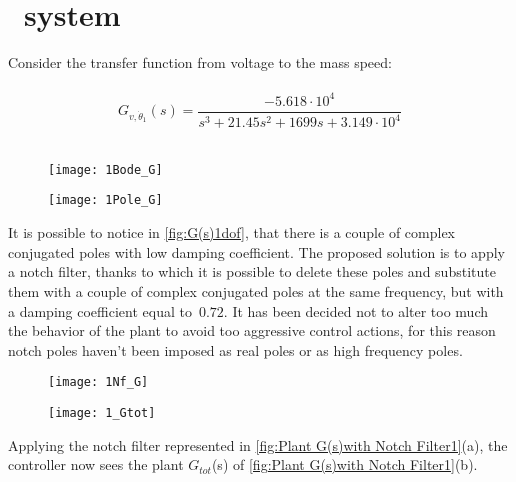 
\section{\onedof\ system}
Consider the transfer function from voltage to the mass speed:\\
\\
\[	
G_{v, \dot \theta_1}(s)=
\frac{-5.618 \cdot 10^{4}}{{s^3 + 21.45 s^{2}}+1699 s+3.149 \cdot 10^{4}}
\]
\\

\begin{figure*}[h]
	\centering
	\begin{subfigure}{0.55\columnwidth}
		\texttt{[image: 1Bode\_G]}
	\end{subfigure}
	\begin{subfigure}{0.4\columnwidth}
		\texttt{[image: 1Pole\_G]}
	\end{subfigure}
	\caption{$G_{v, \dot \theta_1}(s)$}
	\label{fig:G(s)1dof}
\end{figure*}

It is possible to notice in \cref{fig:G(s)1dof}, that there is a couple of complex conjugated poles with low damping coefficient. The proposed solution is to apply a notch filter, thanks to which it is possible to delete these poles and substitute them with a couple of complex conjugated poles at the same frequency, but with a damping coefficient equal to~$0.72$. It has been decided not to alter too much the behavior of the plant to avoid too aggressive control actions, for this reason notch poles haven't been imposed as real poles or as high frequency poles.

\begin{figure*}[h]
	\centering
	\begin{subfigure}{0.47\columnwidth}
		\texttt{[image: 1Nf\_G]}
	\end{subfigure}
	\begin{subfigure}{0.47\columnwidth}
		\texttt{[image: 1\_Gtot]}
	\end{subfigure}
	\caption{Plant $G(s)$ with Notch Filter $N_f(s)$: $G_{tot}(s)$}
	\label{fig:Plant G(s)with Notch Filter1}
\end{figure*}


Applying the notch filter represented in \cref{fig:Plant G(s)with Notch Filter1}(a), the controller now sees the plant $G_{tot}$(s) of \cref{fig:Plant G(s)with Notch Filter1}(b).

